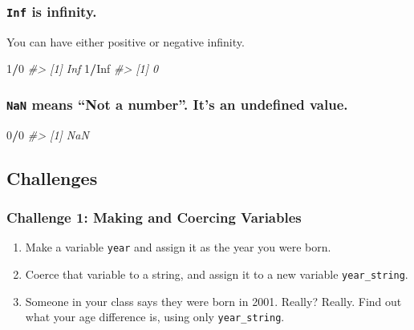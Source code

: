 \documentclass[]{book}
\newenvironment{Shaded}{\begin{snugshade}}{\end{snugshade}}
\newcommand{\CommentTok}[1]{\textcolor[rgb]{0.56,0.35,0.01}{\textit{#1}}}
\newcommand{\DecValTok}[1]{\textcolor[rgb]{0.00,0.00,0.81}{#1}}
\newcommand{\OperatorTok}[1]{\textcolor[rgb]{0.81,0.36,0.00}{\textbf{#1}}}
\newcommand{\OtherTok}[1]{\textcolor[rgb]{0.56,0.35,0.01}{#1}}
\providecommand{\tightlist}{%
  \setlength{\itemsep}{0pt}\setlength{\parskip}{0pt}}
\begin{document}
\hypertarget{inf-is-infinity.}{%
\subsubsection*{\texorpdfstring{\texttt{Inf} is infinity.}{Inf is infinity.}}\label{inf-is-infinity.}}

You can have either positive or negative infinity.

\begin{Shaded}
\begin{Highlighting}[]
\DecValTok{1}\OperatorTok{/}\DecValTok{0}
\CommentTok{#> [1] Inf}
\DecValTok{1}\OperatorTok{/}\OtherTok{Inf}
\CommentTok{#> [1] 0}
\end{Highlighting}
\end{Shaded}

\hypertarget{nan-means-not-a-number.-its-an-undefined-value.}{%
\subsubsection*{\texorpdfstring{\texttt{NaN} means ``Not a number''. It's an undefined value.}{NaN means ``Not a number''. It's an undefined value.}}\label{nan-means-not-a-number.-its-an-undefined-value.}}

\begin{Shaded}
\begin{Highlighting}[]
\DecValTok{0}\OperatorTok{/}\DecValTok{0}
\CommentTok{#> [1] NaN}
\end{Highlighting}
\end{Shaded}

\hypertarget{challenges-4}{%
\subsection{Challenges}\label{challenges-4}}

\hypertarget{challenge-1-making-and-coercing-variables}{%
\subsubsection*{Challenge 1: Making and Coercing Variables}\label{challenge-1-making-and-coercing-variables}}

\begin{enumerate}
\def\labelenumi{\arabic{enumi}.}
\tightlist
\item
  Make a variable \texttt{year} and assign it as the year you were born.
\item
  Coerce that variable to a string, and assign it to a new variable \texttt{year\_string}.
\item
  Someone in your class says they were born in 2001. Really? Really. Find out what your age difference is, using only \texttt{year\_string}.
\end{enumerate}
\end{document}
